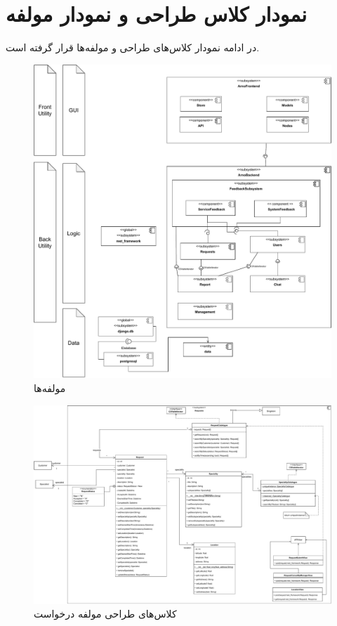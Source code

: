 

\chapter{نمودار کلاس طراحی و  نمودار مولفه}
\label{chapter:classDesign}

در ادامه نمودار کلاس‌های طراحی و مولفه‌ها قرار گرفته است.

\eject \pdfpagewidth=13in \pdfpageheight=15in

\begin{figure}[ht!]
	\centering
	\includegraphics[scale=0.8]{figs/design-class/comps.pdf}
	\caption{مولفه‌ها}
\end{figure}
\FloatBarrier
\newpage

\eject \pdfpagewidth=18in \pdfpageheight=17in

\begin{figure}[ht!]
	\centering
	\includegraphics[scale=0.8]{figs/design-class/requests.pdf}
	\caption{کلاس‌های طراحی مولفه درخواست}
\end{figure}
\FloatBarrier
\newpage


